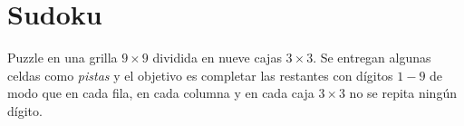 
\section{Sudoku}\label{sec:01-sudoku}
Puzzle en una grilla \(9\times9\) dividida en nueve cajas \(3\times3\). Se entregan algunas celdas como \emph{pistas} y el objetivo es completar las restantes con dígitos \(1\!-\!9\) de modo que en cada fila, en cada columna y en cada caja \(3\times3\) no se repita ningún dígito.